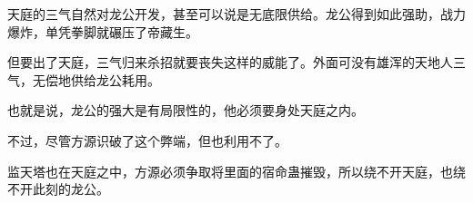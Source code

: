 \begin{this_body}
天庭的三气自然对龙公开发，甚至可以说是无底限供给。龙公得到如此强助，战力爆炸，单凭拳脚就碾压了帝藏生。

但要出了天庭，三气归来杀招就要丧失这样的威能了。外面可没有雄浑的天地人三气，无偿地供给龙公耗用。

也就是说，龙公的强大是有局限性的，他必须要身处天庭之内。

不过，尽管方源识破了这个弊端，但也利用不了。

监天塔也在天庭之中，方源必须争取将里面的宿命蛊摧毁，所以绕不开天庭，也绕不开此刻的龙公。

\end{this_body}

